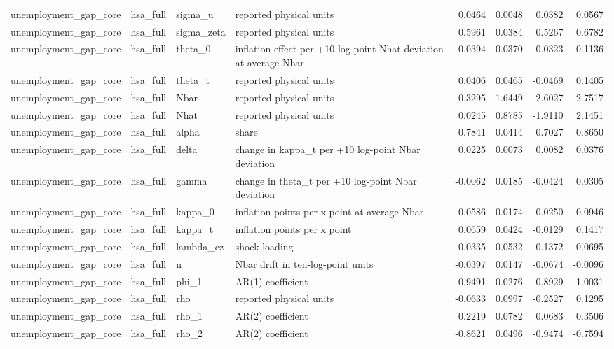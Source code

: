 \begin{tabular}{llllrrrr}
unemployment\_gap\_core & hsa\_full & sigma\_u & reported physical units & 0.0464 & 0.0048 & 0.0382 & 0.0567 \\
unemployment\_gap\_core & hsa\_full & sigma\_zeta & reported physical units & 0.5961 & 0.0384 & 0.5267 & 0.6782 \\
unemployment\_gap\_core & hsa\_full & theta\_0 & inflation effect per +10 log-point Nhat deviation at average Nbar & 0.0394 & 0.0370 & -0.0323 & 0.1136 \\
unemployment\_gap\_core & hsa\_full & theta\_t & reported physical units & 0.0406 & 0.0465 & -0.0469 & 0.1405 \\
unemployment\_gap\_core & hsa\_full & Nbar & reported physical units & 0.3295 & 1.6449 & -2.6027 & 2.7517 \\
unemployment\_gap\_core & hsa\_full & Nhat & reported physical units & 0.0245 & 0.8785 & -1.9110 & 2.1451 \\
unemployment\_gap\_core & hsa\_full & alpha & share & 0.7841 & 0.0414 & 0.7027 & 0.8650 \\
unemployment\_gap\_core & hsa\_full & delta & change in kappa\_t per +10 log-point Nbar deviation & 0.0225 & 0.0073 & 0.0082 & 0.0376 \\
unemployment\_gap\_core & hsa\_full & gamma & change in theta\_t per +10 log-point Nbar deviation & -0.0062 & 0.0185 & -0.0424 & 0.0305 \\
unemployment\_gap\_core & hsa\_full & kappa\_0 & inflation points per x point at average Nbar & 0.0586 & 0.0174 & 0.0250 & 0.0946 \\
unemployment\_gap\_core & hsa\_full & kappa\_t & inflation points per x point & 0.0659 & 0.0424 & -0.0129 & 0.1417 \\
unemployment\_gap\_core & hsa\_full & lambda\_ez & shock loading & -0.0335 & 0.0532 & -0.1372 & 0.0695 \\
unemployment\_gap\_core & hsa\_full & n & Nbar drift in ten-log-point units & -0.0397 & 0.0147 & -0.0674 & -0.0096 \\
unemployment\_gap\_core & hsa\_full & phi\_1 & AR(1) coefficient & 0.9491 & 0.0276 & 0.8929 & 1.0031 \\
unemployment\_gap\_core & hsa\_full & rho & reported physical units & -0.0633 & 0.0997 & -0.2527 & 0.1295 \\
unemployment\_gap\_core & hsa\_full & rho\_1 & AR(2) coefficient & 0.2219 & 0.0782 & 0.0683 & 0.3506 \\
unemployment\_gap\_core & hsa\_full & rho\_2 & AR(2) coefficient & -0.8621 & 0.0496 & -0.9474 & -0.7594 \\

\end{tabular}
